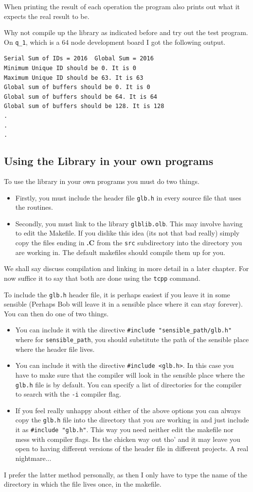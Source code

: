 When printing the result of each operation the program also prints
out what it expects the real result to be.

Why not compile up the library as indicated before and try out the test
program. On {\tt q\_1}, which is a 64 node development board I got
the following output.
\begin{verbatim}
Serial Sum of IDs = 2016  Global Sum = 2016
Minimum Unique ID should be 0. It is 0
Maximum Unique ID should be 63. It is 63
Global sum of buffers should be 0. It is 0
Global sum of buffers should be 64. It is 64
Global sum of buffers should be 128. It is 128
.
.
.
\end{verbatim}

\subsection{Using the Library in your own programs}
To use the library in your own programs you must do two things.
\begin{itemize}
\item
Firstly, you must include the header file {\tt glb.h} in every
source file that uses the routines.
\item
Secondly, you must link to the library {\tt glblib.olb}. This
may involve having to edit the Makefile. If you dislike this
idea (its not that bad really) simply copy the files ending in
{\bf .C} from the {\tt src} subdirectory into the directory 
you are working in. The default makefiles should compile
them up for you.
\end{itemize}

We shall say discuss compilation and linking in more detail in 
a later chapter. For now suffice it to say that both are done
using the {\tt tcpp} command. 

To include the {\tt glb.h} header file, it is perhaps easiest 
if you leave it in some sensible (Perhaps Bob will leave it
in a sensible place where it can stay forever). You can then do 
one of two things.
\begin{itemize}
\item
You can include it with the directive {\tt \#include "sensible\_path/glb.h"}
where for {\tt sensible\_path}, you should substitute the path
of the sensible place where the header file lives.
\item
You can include it with the directive {\tt \#include <glb.h>}. In this
case you have to make sure that the compiler will look in the sensible
place where the {\tt glb.h} file is by default. You can specify
a list of directories for the compiler to search with the {\tt -i}
compiler flag.
\item
If you feel really unhappy about either of the above options you can
always copy the {\tt glb.h} file into the directory that you are working
in and just include it as {\tt \#include "glb.h"}. This way you need
neither edit the makefile nor mess with compiler flags. Its the 
chicken way out tho' and it may leave you open to having
different versions of the header file in different projects. A real
nightmare...
\end{itemize}
I prefer the latter method personally, as then I only have to 
type the name of the directory in which the file lives once, in
the makefile.

